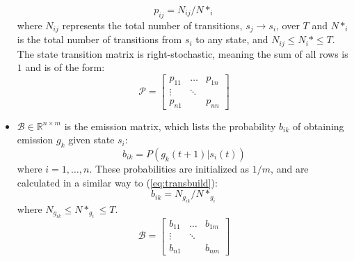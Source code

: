 \documentclass[letterpaper, 10 pt, conference]{ieeeconf}  %
\newcommand\NB[1]{$\spadesuit$\footnote{NB: #1}}
\begin{document}
\begin{itemize}
        \begin{equation} \label{eq:transbuild}
            p_{ij} = N_{ij}/N*_{i}
        \end{equation}
        where $N_{ij}$ represents the total number of transitions, $s_j \to s_i$, over $T$ and $N*_{i}$ is the total number of transitions from $s_i$ to any state, and $N_{ij} \leq N_{i}* \leq T$. The state transition matrix is right-stochastic, meaning the sum of all rows is $1$ and is of the form:
        \begin{equation}
            \mathcal{P} = 
                    \begin{bmatrix}
                        p_{11} & \dots & p_{1n} \\
                        \vdots & \ddots & \\
                        p_{n1} &    & p_{nn}
                    \end{bmatrix}
        \end{equation}
    \item $\mathcal{B}\in\mathbb{R}^{n\times m}$ is the emission matrix, which lists the probability $b_{ik}$ of obtaining emission $g_k$ given state $s_i$:
        \begin{equation} \label{eq:obsref}
            b_{ik} = P(g_k(t+1) \vert s_i(t))
        \end{equation}
        where $i = 1,\ldots,n$. These probabilities are initialized as $1/m$, and are calculated in a similar way to (\ref{eq:transbuild}):
        \begin{equation} \label{eq:obsbuild}
            b_{ik} = N_{g_{ik}}/N*_{g_{i}}
        \end{equation} 
        where $N_{g_{ik}} \leq N*_{g_{i}} \leq T$.
        \begin{equation}
            \mathcal{B} = 
                    \begin{bmatrix}
                        b_{11} & \dots & b_{1m} \\
                        \vdots & \ddots & \\
                        b_{n1} &    & b_{nm}
                    \end{bmatrix}
        \end{equation}
\end{itemize}
\end{document}
